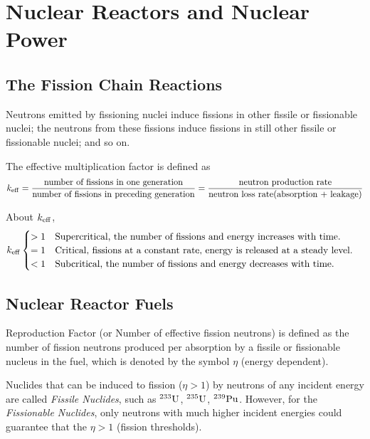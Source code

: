 \section{Nuclear Reactors and Nuclear Power}

\subsection{The Fission Chain Reactions}

Neutrons emitted by fissioning nuclei induce fissions in other fissile or fissionable nuclei; the neutrons from these fissions induce fissions in still other fissile or fissionable nuclei; and so on.

\begin{definition}
    The effective multiplication factor is defined as
    \begin{equation}
        k_{\rm eff} = \frac{\text{number of fissions in one generation}}{\text{number of fissions in preceding generation}} = \frac{\text{neutron production rate}}{\text{neutron loss rate(absorption + leakage)}}
    \end{equation}
\end{definition}

About $k_{\rm eff}$, 
\begin{equation}
    k_{\rm eff} \begin{cases}
        >1\quad \text{Supercritical, the number of fissions and energy increases with time.} \\
        =1\quad \text{Critical, fissions at a constant rate, energy is released at a steady level.} \\
        <1\quad \text{Subcritical, the number of fissions and energy decreases with time.}
    \end{cases}
\end{equation}

\subsection{Nuclear Reactor Fuels}

\begin{definition}
    Reproduction Factor (or Number of effective fission neutrons) is defined as the number of fission neutrons produced per absorption by a fissile or fissionable nucleus in the fuel, which is denoted by the symbol $\eta$ (energy dependent).
\end{definition}

\begin{fact}
    Nuclides that can be induced to fission ($\eta > 1$) by neutrons of any incident energy are called {\itshape Fissile Nuclides}, such as ${}^{233}{\rm U}$, ${}^{235}{\rm U}$, ${}^{239}{\rm Pu}$. However, for the {\itshape Fissionable Nuclides}, only neutrons with much higher incident energies could guarantee that the $\eta > 1$ (fission thresholds).
\end{fact}

